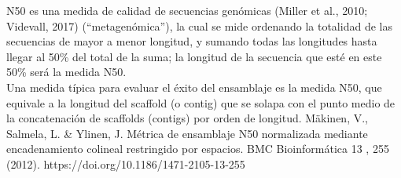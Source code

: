 
N50 es una medida de calidad de secuencias genómicas (Miller et al., 2010; Videvall, 2017) (“metagenómica”), la cual se mide ordenando la totalidad de las secuencias de mayor a menor longitud, y sumando todas las longitudes hasta llegar al 50\% del total de la suma; la longitud de la secuencia que esté en este 50\% será la medida N50.  \\

Una medida típica para evaluar el éxito del ensamblaje es la medida N50, que equivale a la longitud del scaﬀold (o contig) que se solapa con el punto medio de la concatenación de scaﬀolds (contigs) por orden de longitud. Mäkinen, V., Salmela, L. \& Ylinen, J. Métrica de ensamblaje N50 normalizada mediante encadenamiento colineal restringido por espacios. BMC Bioinformática 13 , 255 (2012). https://doi.org/10.1186/1471-2105-13-255   \\
